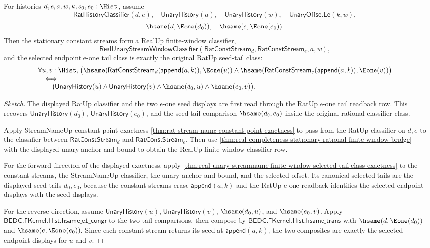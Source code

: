 \begin{theorem}
\label{thm:real-completeness-stationary-rational-selected-tail-seed-exactness}
For histories $d,e,a,w,k,d_0,e_0:\Hist$, assume
$$
\mathsf{RatHistoryClassifier}(d,e),\quad
\mathsf{UnaryHistory}(a),\quad
\mathsf{UnaryHistory}(w),\quad
\mathsf{UnaryOffsetLe}(k,w),
$$
$$
\hsame(d,\Eone(d_0)),\quad
\hsame(e,\Eone(e_0)).
$$
Then the stationary constant streams form a RealUp finite-window classifier,
$$
\mathsf{RealUnaryStreamWindowClassifier}(\mathsf{RatConstStream}_d,\mathsf{RatConstStream}_e,a,w),
$$
and the selected endpoint e-one tail class is exactly the original RatUp seed-tail
class:
$$
\begin{array}{l}
\forall u,v:\Hist,\,
\bigl(\hsame(\mathsf{RatConstStream}_d(\mathsf{append}(a,k)),\Eone(u))\land
\hsame(\mathsf{RatConstStream}_e(\mathsf{append}(a,k)),\Eone(v))\bigr)\\
\quad\Longleftrightarrow\\
\qquad
\bigl(\mathsf{UnaryHistory}(u)\land
\mathsf{UnaryHistory}(v)\land
\hsame(d_0,u)\land
\hsame(e_0,v)\bigr).
\end{array}
$$
\end{theorem}

\begin{proof}[Sketch]
The displayed RatUp classifier and the two e-one seed displays are first read
through the RatUp e-one tail readback row. This recovers
$\mathsf{UnaryHistory}(d_0)$, $\mathsf{UnaryHistory}(e_0)$, and the seed-tail
comparison $\hsame(d_0,e_0)$ inside the original rational classifier class.

Apply StreamNameUp constant point exactness
\autoref{thm:rat-stream-name-constant-point-exactness} to pass from the RatUp
classifier on $d,e$ to the classifier between
$\mathsf{RatConstStream}_d$ and $\mathsf{RatConstStream}_e$. Then use
\autoref{thm:real-completeness-stationary-rational-finite-window-bridge} with
the displayed unary anchor and bound to obtain the RealUp finite-window
classifier row.

For the forward direction of the displayed exactness, apply
\autoref{thm:real-unary-streamname-finite-window-selected-tail-class-exactness}
to the constant streams, the StreamNameUp classifier, the unary anchor and
bound, and the selected offset. Its canonical selected tails are the displayed
seed tails $d_0,e_0$, because the constant streams erase
$\mathsf{append}(a,k)$ and the RatUp e-one readback identifies the selected
endpoint displays with the seed displays.

For the reverse direction, assume $\mathsf{UnaryHistory}(u)$,
$\mathsf{UnaryHistory}(v)$, $\hsame(d_0,u)$, and $\hsame(e_0,v)$. Apply
$\mathsf{BEDC.FKernel.Hist.hsame\_e1\_congr}$ to the two tail comparisons, then
compose by $\mathsf{BEDC.FKernel.Hist.hsame\_trans}$ with
$\hsame(d,\Eone(d_0))$ and $\hsame(e,\Eone(e_0))$. Since each constant stream
returns its seed at $\mathsf{append}(a,k)$, the two composites are exactly the
selected endpoint displays for $u$ and $v$.
\end{proof}

